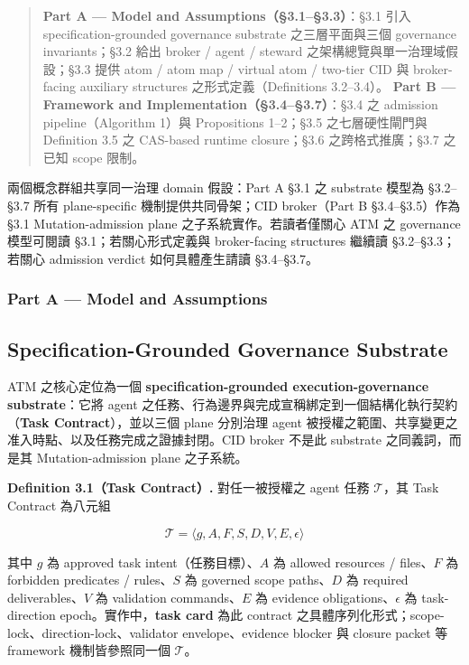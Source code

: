 \documentclass[a4paper,fontset=none]{ctexart}
\begin{document}
\begin{quote}
\textbf{Part A --- Model and Assumptions（§3.1--§3.3）}：§3.1 引入 specification-grounded governance substrate 之三層平面與三個 governance invariants；§3.2 給出 broker / agent / steward 之架構總覽與單一治理域假設；§3.3 提供 atom / atom map / virtual atom / two-tier CID 與 broker-facing auxiliary structures 之形式定義（Definitions 3.2--3.4）。  \textbf{Part B --- Framework and Implementation（§3.4--§3.7）}：§3.4 之 admission pipeline（Algorithm 1）與 Propositions 1--2；§3.5 之七層硬性閘門與 Definition 3.5 之 CAS-based runtime closure；§3.6 之跨格式推廣；§3.7 之已知 scope 限制。
\end{quote}

兩個概念群組共享同一治理 domain 假設：Part A §3.1 之 substrate 模型為 §3.2--§3.7 所有 plane-specific 機制提供共同骨架；CID broker（Part B §3.4--§3.5）作為 §3.1 Mutation-admission plane 之子系統實作。若讀者僅關心 ATM 之 governance 模型可閱讀 §3.1；若關心形式定義與 broker-facing structures 繼續讀 §3.2--§3.3；若關心 admission verdict 如何具體產生請讀 §3.4--§3.7。

\medskip

\subsubsection*{Part A --- Model and Assumptions}

\subsection{Specification-Grounded Governance Substrate}

ATM 之核心定位為一個 \textbf{specification-grounded execution-governance substrate}：它將 agent 之任務、行為邊界與完成宣稱綁定到一個結構化執行契約（\textbf{Task Contract}），並以三個 plane 分別治理 agent 被授權之範圍、共享變更之准入時點、以及任務完成之證據封閉。CID broker 不是此 substrate 之同義詞，而是其 Mutation-admission plane 之子系統。

\textbf{Definition 3.1（Task Contract）.} 對任一被授權之 agent 任務 $\mathcal{T}$，其 Task Contract 為八元組

$$\mathcal{T} = \langle g, A, F, S, D, V, E, \epsilon \rangle$$

其中 $g$ 為 approved task intent（任務目標）、$A$ 為 allowed resources / files、$F$ 為 forbidden predicates / rules、$S$ 為 governed scope paths、$D$ 為 required deliverables、$V$ 為 validation commands、$E$ 為 evidence obligations、$\epsilon$ 為 task-direction epoch。實作中，\textbf{task card} 為此 contract 之具體序列化形式；scope-lock、direction-lock、validator envelope、evidence blocker 與 closure packet 等 framework 機制皆參照同一個 $\mathcal{T}$。
\end{document}
